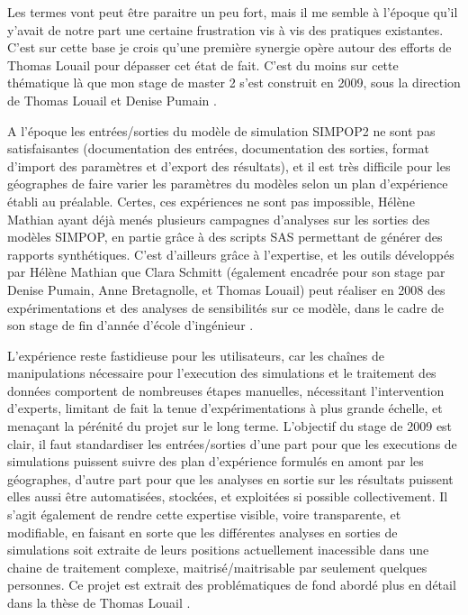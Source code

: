 Les termes vont peut être paraitre un peu fort, mais il me semble à l'époque qu'il y'avait de notre part une certaine frustration vis à vis des pratiques existantes. C'est sur cette base je crois qu'une première synergie opère autour des efforts de Thomas Louail pour dépasser cet état de fait. C'est du moins sur cette thématique là que mon stage de master 2 s'est construit en 2009, sous la direction de Thomas Louail et Denise Pumain \autocite{Rey2009}. 

A l'époque les entrées/sorties du modèle de simulation SIMPOP2 ne sont pas satisfaisantes (documentation des entrées, documentation des sorties, format d'import des paramètres et d'export des résultats), et il est très difficile pour les géographes de faire varier les paramètres du modèles selon un plan d'expérience établi au préalable. Certes, ces expériences ne sont pas impossible, Hélène Mathian ayant déjà menés plusieurs campagnes d'analyses sur les sorties des modèles SIMPOP, en partie grâce à des scripts SAS permettant de générer des rapports synthétiques. C'est d'ailleurs grâce à l'expertise, et les outils développés par Hélène Mathian que Clara Schmitt (également encadrée pour son stage par Denise Pumain, Anne Bretagnolle, et Thomas Louail) peut réaliser en 2008 des expérimentations et des analyses de sensibilités sur ce modèle, dans le cadre de son stage de fin d'année d'école d'ingénieur \autocite{Schmitt2008}. 

L'expérience reste fastidieuse pour les utilisateurs, car les chaînes de manipulations nécessaire pour l'execution des simulations et le traitement des données comportent de nombreuses étapes manuelles, nécessitant l'intervention d'experts, limitant de fait la tenue d'expérimentations à plus grande échelle, et menaçant la pérénité du projet sur le long terme. L'objectif du stage de 2009 est clair, il faut standardiser les entrées/sorties d'une part pour que les executions de simulations puissent suivre des plan d'expérience formulés en amont par les géographes, d'autre part pour que les analyses en sortie sur les résultats puissent elles aussi être automatisées, stockées, et exploitées si possible collectivement. Il s'agit également de rendre cette expertise visible, voire transparente, et modifiable, en faisant en sorte que les différentes analyses en sorties de simulations soit extraite de leurs positions actuellement inacessible dans une chaine de traitement complexe, maitrisé/maitrisable par seulement quelques personnes. Ce projet est extrait des problématiques de fond abordé plus en détail dans la thèse de Thomas Louail \autocite[132-145]{Louail2010}.


